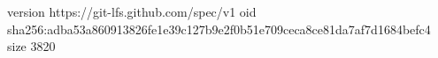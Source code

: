 version https://git-lfs.github.com/spec/v1
oid sha256:adba53a860913826fe1e39c127b9e2f0b51e709ceca8ce81da7af7d1684befc4
size 3820
